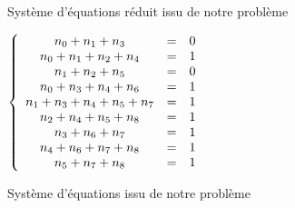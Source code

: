 \documentclass[10pt,a2paper]{article}
\begin{document}
\begin{LARGE}Système d'équations réduit issu de notre problème\end{LARGE}

\vspace{2em}$\left\{\begin{array}{c c l}n_{0} +n_{1} +n_{3} &=& 0\\n_{0} +n_{1} +n_{2} +n_{4} &=& 1\\n_{1} +n_{2} +n_{5} &=& 0\\n_{0} +n_{3} +n_{4} +n_{6} &=& 1\\n_{1} +n_{3} +n_{4} +n_{5} +n_{7} &=& 1\\n_{2} +n_{4} +n_{5} +n_{8} &=& 1\\n_{3} +n_{6} +n_{7} &=& 1\\n_{4} +n_{6} +n_{7} +n_{8} &=& 1\\n_{5} +n_{7} +n_{8} &=& 1\\\end{array}\right.$\newpage\begin{LARGE}Système d'équations issu de notre problème\end{LARGE}
\end{document}

